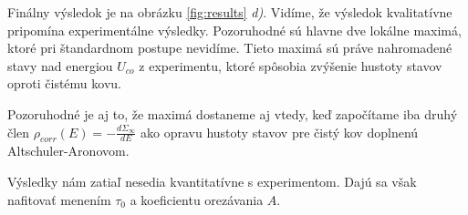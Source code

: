 Finálny výsledok je na obrázku \ref{fig:results} {\it d)}. Vidíme, že výsledok kvalitatívne pripomína experimentálne výsledky. Pozoruhodné sú hlavne dve lokálne maximá, ktoré pri štandardnom postupe nevidíme. Tieto maximá sú práve nahromadené stavy nad energiou $U_{co}$ z experimentu, ktoré spôsobia zvýšenie hustoty stavov oproti čistému kovu. 

Pozoruhodné je aj to, že maximá dostaneme aj vtedy, keď započítame iba druhý člen  $\rho_{corr}(E)=-\frac{d\Sigma_{\infty}}{dE}$ ako opravu hustoty stavov pre čistý kov doplnenú Altschuler-Aronovom.

Výsledky nám zatiaľ nesedia kvantitatívne s experimentom. Dajú sa však nafitovať menením $\tau_0$ a koeficientu orezávania $A$.
